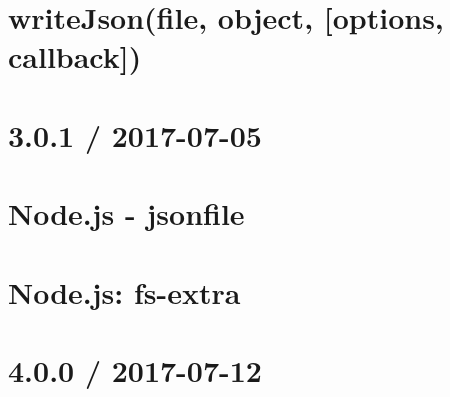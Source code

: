 \documentclass[twoside]{book}
\newcommand{\+}{\discretionary{\mbox{\scriptsize$\hookleftarrow$}}{}{}}
\begin{document}
\chapter{write\+Json(file, object, \mbox{[}options, callback\mbox{]})}
\label{md_dsmacc_examples_DRmerge_node_modules_electron-packager_node_modules_fs-extra_docs_writeJson}

\chapter{3.0.1 / 2017-\/07-\/05}
\label{md_dsmacc_examples_DRmerge_node_modules_electron-packager_node_modules_fs-extra_node_modules_jsonfile_CHANGELOG}

\chapter{Node.\+js -\/ jsonfile}
\label{md_dsmacc_examples_DRmerge_node_modules_electron-packager_node_modules_fs-extra_node_modules_jsonfile_README}

\chapter{Node.\+js\+: fs-\/extra}
\label{md_dsmacc_examples_DRmerge_node_modules_electron-packager_node_modules_fs-extra_README}

\chapter{4.0.0 / 2017-\/07-\/12}
\label{md_dsmacc_examples_DRmerge_node_modules_electron-packager_node_modules_jsonfile_CHANGELOG}

\end{document}
